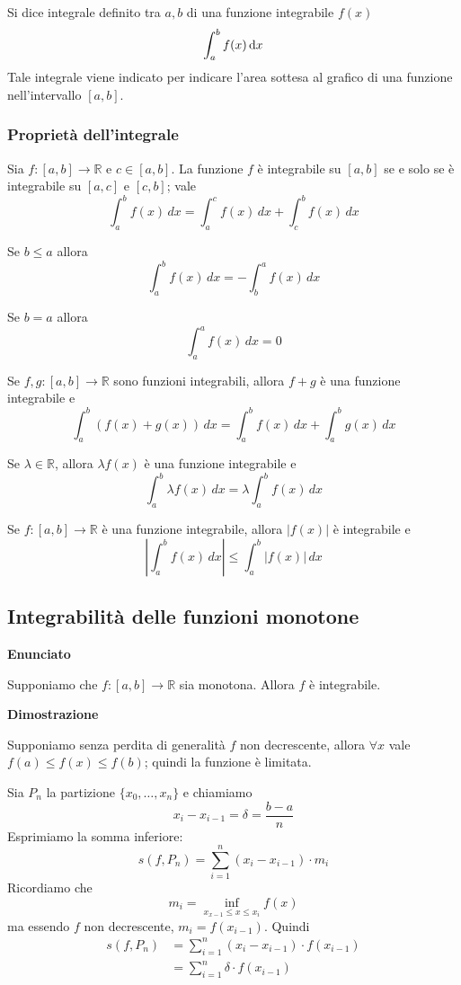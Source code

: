 Si dice integrale definito tra $a,b$ di una funzione integrabile $f(x)$ $$\int_a^b f(x) \mathop{}\!\mathrm{d} x$$ Tale integrale viene indicato per indicare l'area sottesa al grafico di una funzione nell'intervallo $[a,b]$. 

\subsubsection{Proprietà dell'integrale}

Sia $f:[a,b] \to \mathbb{R}$ e $c \in [a,b]$. La funzione $f$ è integrabile su $[a,b]$ se e solo se è integrabile su $[a,c]$ e  $[c,b]$; vale $$\int_a^b f(x) \, dx = \int_a^c f(x) \, dx + \int_c^b f(x) \, dx$$

Se $b \le a$ allora $$\int_a^b f(x) \, dx = - \int_b^a f(x) \, dx$$

Se $b = a$ allora $$\int_a^a f(x) \, dx = 0$$

Se $f, g:[a,b] \to \mathbb{R}$ sono funzioni integrabili, allora $f+g$ è una funzione integrabile e $$\int_a^b (f(x)+g(x)) \, dx = \int_a^b f(x) \, dx + \int_a^b g(x) \, dx$$

Se $\lambda \in \mathbb{R}$, allora $\lambda f(x)$ è una funzione integrabile e $$\int_a^b \lambda f(x) \, dx = \lambda \int_a^b f(x) \, dx$$

Se $f: [a,b] \to \mathbb{R}$ è una funzione integrabile, allora $|f(x)|$ è integrabile e $$\left\lvert \int_a^b f(x) \, dx \right \vert \le \int_a^b |f(x)| \, dx$$

\subsection{Integrabilità delle funzioni monotone}
\textbf{Enunciato}

Supponiamo che $f: [a,b] \to \mathbb{R}$ sia monotona. Allora $f$ è integrabile.

\textbf{Dimostrazione}

Supponiamo senza perdita di generalità $f$ non decrescente, allora $\forall x$ vale $f(a) \le f(x) \le f(b)$; quindi la funzione è limitata.

Sia $P_n$ la partizione $\{x_0, \ldots, x_n\}$ e chiamiamo 
\begin{equation*}
x_i - x_{i-1} = \delta = \frac{b-a}{n}
\end{equation*}
Esprimiamo la somma inferiore:
\begin{equation*}
s(f,P_n) = \sum_{i=1}^n (x_i - x_{i-1}) \cdot m_i
\end{equation*}
Ricordiamo che
\begin{equation*}
m_i = \inf_{x_{x-1}\le x \le x_i} f(x)
\end{equation*}
ma essendo $f$ non decrescente, $m_i = f(x_{i-1})$. Quindi
\begin{align*}
s(f,P_n) &= \sum_{i=1}^n (x_i - x_{i-1}) \cdot f(x_{i-1}) \\
&= \sum_{i=1}^n \delta \cdot f(x_{i-1})
\end{align*}

